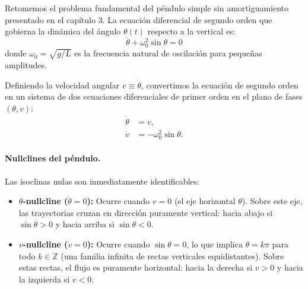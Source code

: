 Retomemos el problema fundamental del péndulo simple sin amortiguamiento presentado en el capítulo 3. La ecuación diferencial de segundo orden que gobierna la dinámica del ángulo $\theta(t)$ respecto a la vertical es:
\begin{equation}
    \ddot{\theta} + \omega_0^2 \sin\theta = 0
    \label{eq:pendulo_segundo_orden}
\end{equation}
donde $\omega_0 = \sqrt{g/L}$ es la frecuencia natural de oscilación para pequeñas amplitudes.

Definiendo la velocidad angular $v \equiv \dot{\theta}$, convertimos la ecuación de segundo orden en un sistema de dos ecuaciones diferenciales de primer orden en el plano de fases $(\theta, v)$:
\begin{equation}
\begin{aligned}
    \dot{\theta} &= v, \\
    \dot{v} &= -\omega_0^2 \sin\theta.
\end{aligned}
\label{eq:sistema_pendulo_plano}
\end{equation}

\paragraph{Nullclines del péndulo.}
Las isoclinas nulas son inmediatamente identificables:
\begin{itemize}
    \item \textbf{$\theta$-nullcline ($\dot{\theta} = 0$):} Ocurre cuando $v = 0$ (el eje horizontal $\theta$). Sobre este eje, las trayectorias cruzan en dirección puramente vertical: hacia abajo si $\sin\theta > 0$ y hacia arriba si $\sin\theta < 0$.
    \item \textbf{$v$-nullcline ($\dot{v} = 0$):} Ocurre cuando $\sin\theta = 0$, lo que implica $\theta = k\pi$ para todo $k \in \mathbb{Z}$ (una familia infinita de rectas verticales equidistantes). Sobre estas rectas, el flujo es puramente horizontal: hacia la derecha si $v > 0$ y hacia la izquierda si $v < 0$.
\end{itemize}

